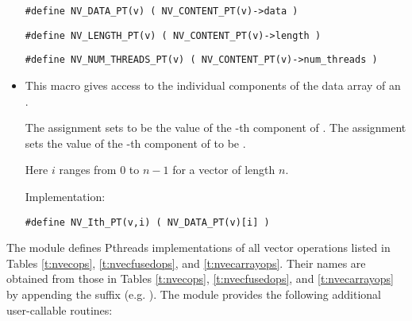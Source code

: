 \begin{itemize}
  \verb|#define NV_DATA_PT(v) ( NV_CONTENT_PT(v)->data )|
  
  \verb|#define NV_LENGTH_PT(v) ( NV_CONTENT_PT(v)->length )|

  \verb|#define NV_NUM_THREADS_PT(v) ( NV_CONTENT_PT(v)->num_threads )|

\item {}                                               
                                                            
  This macro gives access to the individual components of the data
  array of an .

  The assignment  sets  to be the value of 
  the -th component of . The assignment    
  sets the value of the -th component of  to be .        
  
  Here $i$ ranges from $0$ to $n-1$ for a vector of length $n$.

  Implementation:

  \verb|#define NV_Ith_PT(v,i) ( NV_DATA_PT(v)[i] )|

\end{itemize}
The {\nvecpthreads} module defines Pthreads implementations of all vector operations listed 
in Tables \ref{t:nvecops}, \ref{t:nvecfusedops}, and \ref{t:nvecarrayops}. Their names are
obtained from those in Tables \ref{t:nvecops}, \ref{t:nvecfusedops}, and
\ref{t:nvecarrayops} by appending the suffix 
(e.g. ).
The module {\nvecpthreads} provides the following additional user-callable routines:
